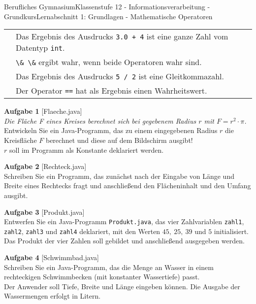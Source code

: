\documentclass[oneside,openany,headings=optiontotoc,11pt,numbers=noenddot]{scrreprt}
\begin{document}
\begin{worksheet}{Berufliches Gymnasium}{Klassenstufe 12 - Informationsverarbeitung - Grundkurs}{Lernabschnitt 1: Grundlagen - Mathematische Operatoren}
\begin{framed}
\begin{tabularx}{0.9\textwidth}{cl}
				\fbox{} & Das Ergebnis des Ausdrucks {\lstinline[style=JavaInputStyle]|3.0 + 4|} ist eine ganze Zahl vom Datentyp {\lstinline[style=JavaInputStyle]|int|}.\\
				\fbox{} & {\lstinline[style=JavaInputStyle]|\& \&|} ergibt wahr, wenn beide Operatoren wahr sind.\\
				\fbox{} & Das Ergebnis des Ausdrucks {\lstinline[style=JavaInputStyle]|5 / 2|} ist eine Gleitkommazahl.\\
				\fbox{} & Der Operator {\lstinline[style=JavaInputStyle]|==|} hat als Ergebnis einen Wahrheitswert.\\
			\end{tabularx}
			\newpage
			\noindent
			\textbf{Aufgabe 1} [Flaeche.java]\\
			\textit{Die Fläche F eines Kreises berechnet sich bei gegebenem Radius \(r\) mit \(F = r^2\cdot\pi\).}\\
			Entwickeln Sie ein Java-Programm, das zu einem eingegebenen Radius \(r\) die Kreisfläche \(F\) berechnet und diese auf dem Bildschirm ausgibt!\\
			\(r\) soll im Programm als Konstante deklariert werden.\\
			\par\noindent
			\textbf{Aufgabe 2} [Rechteck.java]\\
			Schreiben Sie ein Programm, das zunächst nach der Eingabe von Länge und Breite eines Rechtecks fragt und anschließend den Flächeninhalt und den Umfang ausgibt.\\
			\par\noindent
			\textbf{Aufgabe 3} [Produkt.java]\\
			Entwerfen Sie ein Java-Programm \lstinline[style=JavaInputStyle]|Produkt.java|, das vier Zahlvariablen \lstinline[style=JavaInputStyle]|zahl1|, \lstinline[style=JavaInputStyle]|zahl2|, \lstinline[style=JavaInputStyle]|zahl3| und \lstinline[style=JavaInputStyle]|zahl4| deklariert, mit den Werten \(45,\ 25,\ 39\) und \(5\) initialisiert.\\
			Das Produkt der vier Zahlen soll gebildet und anschließend ausgegeben werden.\\
			\par\noindent
			\textbf{Aufgabe 4} [Schwimmbad.java]\\
			Schreiben Sie ein Java-Programm, das die Menge an Wasser in einem rechteckigen Schwimmbecken (mit konstanter Wassertiefe) passt.\\
			Der Anwender soll Tiefe, Breite und Länge eingeben können. Die Ausgabe der Wassermengen erfolgt in Litern.\\

\end{framed}
\end{worksheet}
\end{document}
